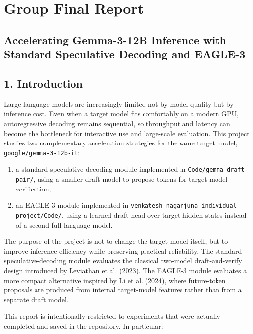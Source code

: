 \documentclass[
]{article}
\author{}
\date{}
\begin{document}
\section{Group Final Report}\label{group-final-report}

\subsection{Accelerating Gemma-3-12B Inference with Standard Speculative
Decoding and
EAGLE-3}\label{accelerating-gemma-3-12b-inference-with-standard-speculative-decoding-and-eagle-3}

\subsection{1. Introduction}\label{1-introduction}

Large language models are increasingly limited not by model quality but
by inference cost. Even when a target model fits comfortably on a modern
GPU, autoregressive decoding remains sequential, so throughput and
latency can become the bottleneck for interactive use and large-scale
evaluation. This project studies two complementary acceleration
strategies for the same target model, \texttt{google/gemma-3-12b-it}:

\begin{enumerate}
\def\labelenumi{\arabic{enumi}.}
\item
  a standard speculative-decoding module implemented in
  \texttt{Code/gemma-draft-pair/}, using a smaller draft model to
  propose tokens for target-model verification;
\item
  an EAGLE-3 module implemented in
  \texttt{venkatesh-nagarjuna-individual-project/Code/}, using a learned
  draft head over target hidden states instead of a second full language
  model.
\end{enumerate}

The purpose of the project is not to change the target model itself, but
to improve inference efficiency while preserving practical reliability.
The standard speculative-decoding module evaluates the classical
two-model draft-and-verify design introduced by Leviathan et al. (2023).
The EAGLE-3 module evaluates a more compact alternative inspired by Li
et al. (2024), where future-token proposals are produced from internal
target-model features rather than from a separate draft model.

This report is intentionally restricted to experiments that were
actually completed and saved in the repository. In particular:
\end{document}
